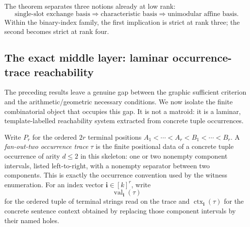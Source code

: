 \documentclass[11pt]{article}
\begin{document}
The theorem separates three notions already at low rank:
\[
 \text{single-slot exchange basis}
 \Longrightarrow
 \text{characteristic basis}
 \Longrightarrow
 \text{unimodular affine basis}.
\]
Within the binary-index family, the first implication is strict at rank three; the second becomes strict at
rank four.

\subsection{The exact middle layer: laminar occurrence-trace reachability}
\label{subsec:laminar-trace}

The preceding results leave a genuine gap between the graphic sufficient
criterion and the arithmetic/geometric necessary conditions.  We now isolate
the finite combinatorial object that occupies this gap.  It is not a matroid:
it is a laminar, template-labelled reachability system extracted from concrete
tuple occurrences.

Write $P_r$ for the ordered $2r$ terminal positions
$A_1<\cdots<A_r<B_1<\cdots<B_r$.  A \emph{fan-out-two occurrence trace}
$\tau$ is the finite positional data of a concrete tuple occurrence of arity
$d\le2$ in this skeleton: one or two nonempty component intervals, listed
left-to-right, with a nonempty separator between two components.  This is
exactly the occurrence convention used by the witness enumeration.
For an index vector $\mathbf i\in[k]^r$,
write
\[
  \operatorname{val}_{\mathbf i}(\tau)
\]
for the ordered tuple of terminal strings read on the trace and
$\operatorname{ctx}_{\mathbf i}(\tau)$ for the concrete sentence context obtained by replacing
those component intervals by their named holes.
\end{document}

